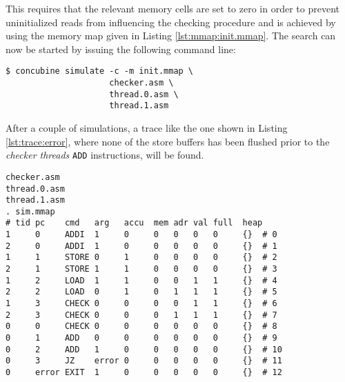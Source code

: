 This requires that the relevant memory cells are set to zero in order to prevent uninitialized reads from influencing the checking procedure and is achieved by using the memory map given in Listing \ref{lst:mmap:init.mmap}.
The search can now be started by issuing the following command line:

\begin{verbatim}
$ concubine simulate -c -m init.mmap \
                     checker.asm \
                     thread.0.asm \
                     thread.1.asm
\end{verbatim}

After a couple of simulations, a trace like the one shown in Listing \ref{lst:trace:error}, where none of the store buffers has been flushed prior to the \emph{checker threads} \lstinline[language={[concubine]Assembler}]{ADD} instructions, will be found.

\begin{lstlisting}[language={[concubine]Assembler}, caption={Sequentially Inconsistent Trace}, label={lst:trace:error}, xleftmargin=\parindent]
checker.asm
thread.0.asm
thread.1.asm
. sim.mmap
# tid pc    cmd   arg   accu  mem adr val full  heap
1     0     ADDI  1     0     0   0   0   0     {}  # 0
2     0     ADDI  1     0     0   0   0   0     {}  # 1
1     1     STORE 0     1     0   0   0   0     {}  # 2
2     1     STORE 1     1     0   0   0   0     {}  # 3
1     2     LOAD  1     1     0   0   1   1     {}  # 4
2     2     LOAD  0     1     0   1   1   1     {}  # 5
1     3     CHECK 0     0     0   0   1   1     {}  # 6
2     3     CHECK 0     0     0   1   1   1     {}  # 7
0     0     CHECK 0     0     0   0   0   0     {}  # 8
0     1     ADD   0     0     0   0   0   0     {}  # 9
0     2     ADD   1     0     0   0   0   0     {}  # 10
0     3     JZ    error 0     0   0   0   0     {}  # 11
0     error EXIT  1     0     0   0   0   0     {}  # 12
\end{lstlisting}

